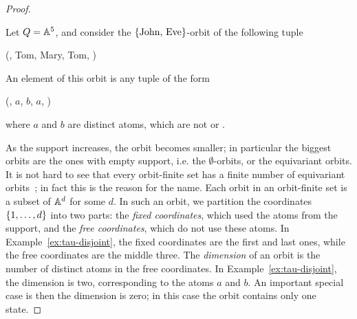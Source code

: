 \begin{proof}
\begin{myexample}\label{ex:tau-disjoint}
    Let $Q = \mathbb A^5$, and consider the $\{\text{{John}, {Eve}}\}$-orbit of the following tuple
    \begin{center}
        (, Tom, Mary, Tom, )
    \end{center}
    An element of this orbit is any tuple of the form 
    \begin{center}
        (, $a$, $b$, $a$, )
    \end{center}
    where $a$ and $b$ are distinct atoms, which are not  or . 
\end{myexample}

 As the support increases, the orbit becomes smaller; in particular the biggest orbits are the ones with empty support, i.e.
 the $\emptyset$-orbits, or the equivariant orbits. It is not hard to see that every orbit-finite set has a finite number of equivariant orbits~\cite[Lemma 1.4]{bojanczyk_slightly}; in fact this is the reason for the name.  
Each orbit in an orbit-finite set is a subset of $\mathbb A^d$ for some $d$. In such an orbit, we partition the coordinates $\{1,\ldots,d\}$ into two parts: the \emph{fixed coordinates}, which used the atoms from the support, and the \emph{free coordinates}, which do not use these atoms. In Example~\ref{ex:tau-disjoint}, the fixed coordinates are  the first and last ones, while the free coordinates are the middle three. The \emph{dimension} of an orbit is the number of distinct atoms in the free coordinates. In Example~\ref{ex:tau-disjoint}, the dimension is two, corresponding to the atoms $a$ and $b$. 
An important special case is then the dimension is zero; in this case the orbit contains only one state.


\end{proof}
